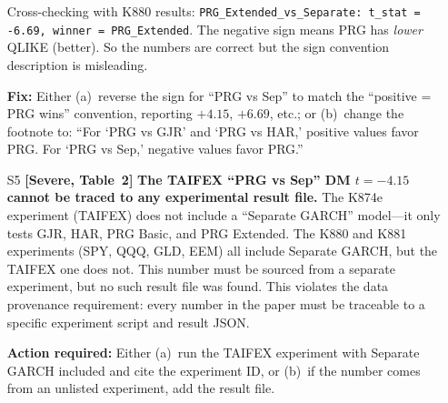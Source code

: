 \documentclass[12pt,a4paper]{article}
\begin{document}
\begin{itemize}[nosep]
  Cross-checking with K880 results: \texttt{PRG\_Extended\_vs\_Separate: t\_stat = -6.69, winner = PRG\_Extended}. The negative sign means PRG has \emph{lower} QLIKE (better). So the numbers are correct but the sign convention description is misleading.

  \textbf{Fix:} Either (a)~reverse the sign for ``PRG vs Sep'' to match the ``positive = PRG wins'' convention, reporting $+4.15$, $+6.69$, etc.; or (b)~change the footnote to: ``For `PRG vs GJR' and `PRG vs HAR,' positive values favor PRG. For `PRG vs Sep,' negative values favor PRG.''

\item [\textcolor{errorred}{S5}] \textbf{[Severe, Table~2]} \textbf{The TAIFEX ``PRG vs Sep'' DM $t=-4.15$ cannot be traced to any experimental result file.} The K874e experiment (TAIFEX) does not include a ``Separate GARCH'' model---it only tests GJR, HAR, PRG Basic, and PRG Extended. The K880 and K881 experiments (SPY, QQQ, GLD, EEM) all include Separate GARCH, but the TAIFEX one does not. This number must be sourced from a separate experiment, but no such result file was found. This violates the data provenance requirement: every number in the paper must be traceable to a specific experiment script and result JSON.

  \textbf{Action required:} Either (a)~run the TAIFEX experiment with Separate GARCH included and cite the experiment ID, or (b)~if the number comes from an unlisted experiment, add the result file.
\end{itemize}
\end{document}
